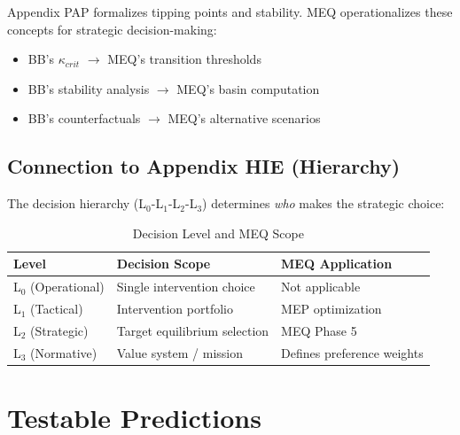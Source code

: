 Appendix PAP formalizes tipping points and stability. MEQ operationalizes these
concepts for strategic decision-making:

\begin{itemize}[nosep]
    \item BB's $\kappa_{crit}$ $\to$ MEQ's transition thresholds
    \item BB's stability analysis $\to$ MEQ's basin computation
    \item BB's counterfactuals $\to$ MEQ's alternative scenarios
\end{itemize}

\subsection{Connection to Appendix HIE (Hierarchy)}

The decision hierarchy (L$_0$-L$_1$-L$_2$-L$_3$) determines \textit{who} makes
the strategic choice:

\begin{table}[H]
\centering
\caption{Decision Level and MEQ Scope}
\label{tab:meq-hierarchy}
\renewcommand{\arraystretch}{1.3}
\begin{tabular}{@{}lll@{}}
\toprule
\textbf{Level} & \textbf{Decision Scope} & \textbf{MEQ Application} \\
\midrule
L$_0$ (Operational) & Single intervention choice & Not applicable \\
L$_1$ (Tactical) & Intervention portfolio & MEP optimization \\
L$_2$ (Strategic) & Target equilibrium selection & MEQ Phase 5 \\
L$_3$ (Normative) & Value system / mission & Defines preference weights \\
\bottomrule
\end{tabular}
\end{table}

\section{Testable Predictions}
\label{sec:meq-predictions}

